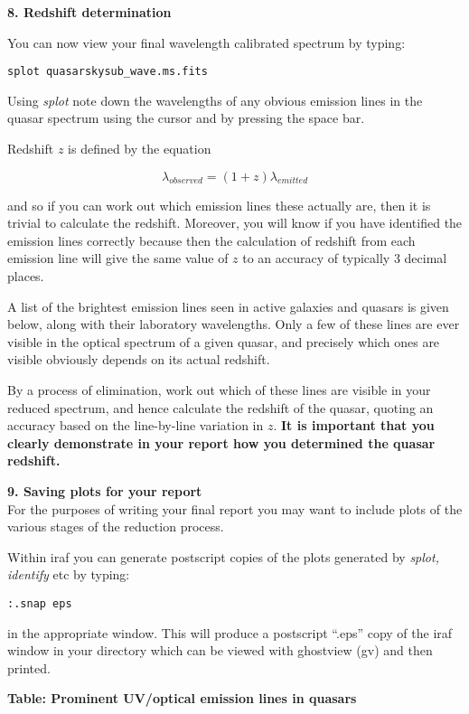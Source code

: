 {\large {\bf 8. Redshift determination}}

You can now view your final wavelength calibrated spectrum by typing:

{\tt splot \verb,quasarskysub_wave.ms.fits,}

Using {\it splot} note down the wavelengths of any obvious emission
lines in the quasar spectrum using the cursor and by pressing the space bar.

\bigskip

Redshift $z$ is defined by the equation

$$\lambda_{observed} = (1 + z) \lambda_{emitted}$$

and so if you can work out which emission lines these actually are, then
it is trivial to calculate the redshift. Moreover, you will know if
you have identified the emission lines correctly because then 
the calculation of redshift from each emission line will give the same
value of $z$ to an accuracy of typically 3 decimal places.

A list of the brightest emission lines seen in active galaxies and
quasars is given below, along with their laboratory wavelengths. 
Only a few of these lines are ever visible in the optical spectrum of a given quasar, and
precisely which ones are visible obviously depends on its actual redshift.
 
By a process of elimination, work out which of these lines are visible in
your reduced spectrum, and hence calculate the redshift of the quasar,
quoting an accuracy based on the line-by-line variation in $z$. {\bf It is important that
you clearly demonstrate in your report how you determined the quasar redshift.}

\newpage

{\large {\bf 9. Saving plots for your report}}\\
For the purposes of writing your final report you may want to include
plots of the various stages of the reduction process.

Within {\sc iraf} you can generate
postscript copies of the plots generated by {\it splot, identify} etc
by typing:

{\tt :.snap eps}

in the appropriate window. This will produce a postscript ``.eps''
copy of the {\sc iraf} window in your directory which can be viewed
with ghostview (gv) and then printed.



{\bf Table: Prominent UV/optical emission lines in quasars}

